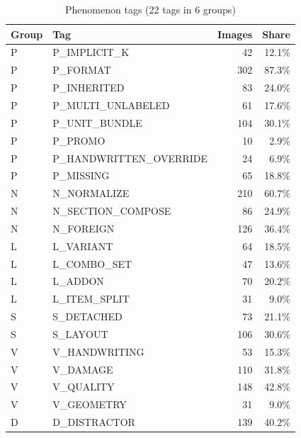 \begin{table}[t]
\centering
\caption{Phenomenon tags (22 tags in 6 groups)}
\label{tab:tags}
\small
\begin{tabular}{llrr}
\toprule
Group & Tag & Images & Share \\
\midrule
P & P\_IMPLICIT\_K & 42 & 12.1\% \\
P & P\_FORMAT & 302 & 87.3\% \\
P & P\_INHERITED & 83 & 24.0\% \\
P & P\_MULTI\_UNLABELED & 61 & 17.6\% \\
P & P\_UNIT\_BUNDLE & 104 & 30.1\% \\
P & P\_PROMO & 10 & 2.9\% \\
P & P\_HANDWRITTEN\_OVERRIDE & 24 & 6.9\% \\
P & P\_MISSING & 65 & 18.8\% \\
N & N\_NORMALIZE & 210 & 60.7\% \\
N & N\_SECTION\_COMPOSE & 86 & 24.9\% \\
N & N\_FOREIGN & 126 & 36.4\% \\
L & L\_VARIANT & 64 & 18.5\% \\
L & L\_COMBO\_SET & 47 & 13.6\% \\
L & L\_ADDON & 70 & 20.2\% \\
L & L\_ITEM\_SPLIT & 31 & 9.0\% \\
S & S\_DETACHED & 73 & 21.1\% \\
S & S\_LAYOUT & 106 & 30.6\% \\
V & V\_HANDWRITING & 53 & 15.3\% \\
V & V\_DAMAGE & 110 & 31.8\% \\
V & V\_QUALITY & 148 & 42.8\% \\
V & V\_GEOMETRY & 31 & 9.0\% \\
D & D\_DISTRACTOR & 139 & 40.2\% \\
\bottomrule
\end{tabular}
\end{table}
